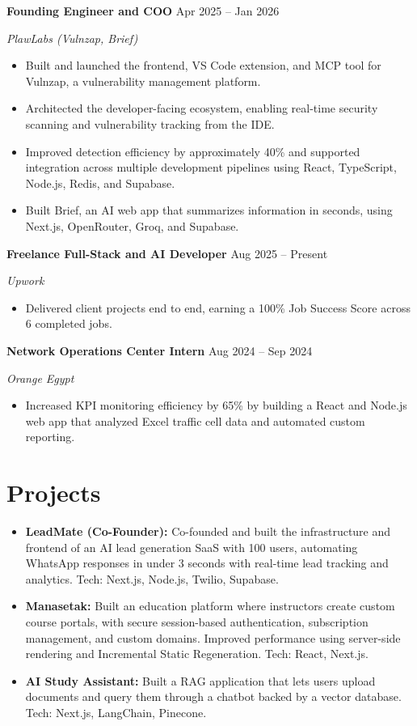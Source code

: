 \documentclass[a4paper,10pt]{article}
\newcommand{\role}[3]{\textbf{#1} \hfill #3\par\textit{#2}\par}
\begin{document}
\role{Founding Engineer and COO}{PlawLabs (Vulnzap, Brief)}{Apr 2025 -- Jan 2026}
\begin{itemize}
    \item Built and launched the frontend, VS Code extension, and MCP tool for Vulnzap, a vulnerability management platform.
    \item Architected the developer-facing ecosystem, enabling real-time security scanning and vulnerability tracking from the IDE.
    \item Improved detection efficiency by approximately 40\% and supported integration across multiple development pipelines using React, TypeScript, Node.js, Redis, and Supabase.
    \item Built Brief, an AI web app that summarizes information in seconds, using Next.js, OpenRouter, Groq, and Supabase.
\end{itemize}
\vspace{3pt}

\role{Freelance Full-Stack and AI Developer}{Upwork}{Aug 2025 -- Present}
\begin{itemize}
    \item Delivered client projects end to end, earning a 100\% Job Success Score across 6 completed jobs.
\end{itemize}
\vspace{3pt}

\role{Network Operations Center Intern}{Orange Egypt}{Aug 2024 -- Sep 2024}
\begin{itemize}
    \item Increased KPI monitoring efficiency by 65\% by building a React and Node.js web app that analyzed Excel traffic cell data and automated custom reporting.
\end{itemize}

\section{Projects}
\begin{itemize}
    \item \textbf{LeadMate (Co-Founder):} Co-founded and built the infrastructure and frontend of an AI lead generation SaaS with 100 users, automating WhatsApp responses in under 3 seconds with real-time lead tracking and analytics. Tech: Next.js, Node.js, Twilio, Supabase.
    \item \textbf{Manasetak:} Built an education platform where instructors create custom course portals, with secure session-based authentication, subscription management, and custom domains. Improved performance using server-side rendering and Incremental Static Regeneration. Tech: React, Next.js.
    \item \textbf{AI Study Assistant:} Built a RAG application that lets users upload documents and query them through a chatbot backed by a vector database. Tech: Next.js, LangChain, Pinecone.
\end{itemize}
\end{document}
